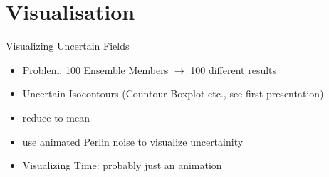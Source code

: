 \section{Visualisation}
\begin{frame}{Visualizing Uncertain Fields}

  \begin{itemize}
    
    \item Problem: 100 Ensemble Members $\to$ 100 different results
    \item Uncertain Isocontours (Countour Boxplot etc., see first presentation)
    \item reduce to mean 
    \item use animated Perlin noise to visualize uncertainity \cite{coninx_visualization_2011}
    \item Visualizing Time: probably just an animation
    
  \end{itemize}

\end{frame}
